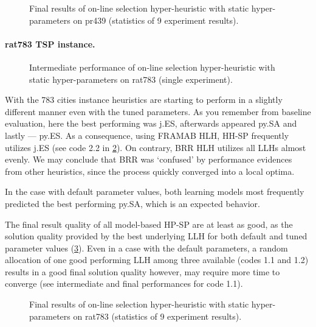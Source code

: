\begin{figure}[b]
	\centering
	\vspace{-20pt}
	
	\caption{Final results of on-line selection hyper-heuristic with static hyper-parameters on pr439 (statistics of 9 experiment results).}
	\vspace{-5pt}
	\label{eval:pict:hh-sp:pr439 final}
\end{figure}

\newpage
\paragraph{rat783 TSP instance.}
\begin{figure}[t]
	\centering
	\vspace{-20pt}
	
	\caption{Intermediate performance of on-line selection hyper-heuristic with static hyper-parameters on rat783 (single experiment).}
	\vspace{-10pt}
	\label{eval:pict:hh-sp:rat783 intermediate}
\end{figure}
With the 783 cities instance heuristics are starting to perform in a slightly different manner even with the tuned parameters. As you remember from baseline evaluation, here the best performing was j.ES, afterwards appeared py.SA and lastly — py.ES. As a consequence, using FRAMAB HLH, HH-SP frequently utilizes j.ES (see code 2.2 in \cref{eval:pict:hh-sp:rat783 intermediate}). On contrary, BRR HLH utilizes all LLHs almost evenly. We may conclude that BRR was `confused' by performance evidences from other heuristics, since the process quickly converged into a local optima.

In the case with default parameter values, both learning models most frequently predicted the best performing py.SA, which is an expected behavior.

The final result quality of all model-based HP-SP are at least as good, as the solution quality provided by the best underlying LLH for both default and tuned parameter values (\cref{eval:pict:hh-sp:rat783 final}). Even in a case with the default parameters, a random allocation of one good performing LLH among three available (codes 1.1 and 1.2) results in a good final solution quality however, may require more time to converge (see intermediate and final performances for code 1.1).

\begin{figure}[b]
	\centering
	\vspace{-20pt}
	
	\caption{Final results of on-line selection hyper-heuristic with static hyper-parameters on rat783 (statistics of 9 experiment results).}
	\vspace{-5pt}
	\label{eval:pict:hh-sp:rat783 final}
\end{figure}

